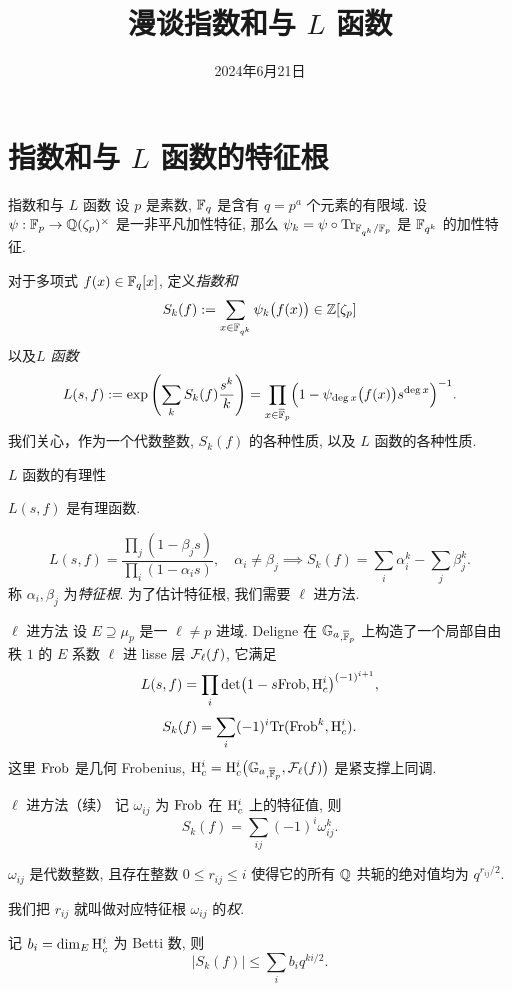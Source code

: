 \documentclass[aspectratio=169,handout]{ctexbeamer}
\title{漫谈指数和与 $L$ 函数}
\date{2024年6月21日}
\begin{document}
\frameoutline

\section{指数和与 $L$ 函数的特征根}

\begin{frame}{指数和与 $L$ 函数}
设 $p$ 是素数, ${\mathbb{F}}_q$ 是含有 $q=p^a$ 个元素的有限域.
设 $\psi:{\mathbb{F}}_p\to {\mathbb{Q}}(\zeta_p)^\times$ 是一非平凡加性特征,
那么 $\psi_k=\psi\circ {\mathrm{Tr}}_{{\mathbb{F}}_{q^k}/{\mathbb{F}}_p}$ 是 ${\mathbb{F}}_{q^k}$ 的加性特征.

对于多项式 $f(x)\in {\mathbb{F}}_q[x]$, 定义\emph{指数和}
\[S_k(f):=\sum_{x\in{\mathbb{F}}_{q^k}}\psi_k\bigl(f(x)\bigr)\in{\mathbb{Z}}[\zeta_p]\]
以及\emph{$L$ 函数}
\[L(s,f):=\exp\left(\sum_k S_k(f)\frac{s^k}{k}\right)=\prod_{x\in\overline{{\mathbb{F}}}_p}\Bigl(1-\psi_{\deg x}\bigl(f(x)\bigr)s^{\deg x}\Bigr)^{-1}.\]
我们关心，作为一个代数整数, $S_k(f)$ 的各种性质, 以及 $L$ 函数的各种性质.
\end{frame}


\begin{frame}{$L$ 函数的有理性}
\begin{theorem}
$L(s,f)$ 是有理函数.
\end{theorem} 
	\[L(s,f)=\frac{\prod_j (1-\beta_j s)}{\prod_i(1-\alpha_i s)},\quad \alpha_i\neq \beta_j
	\implies
	S_k(f)=\sum_i \alpha_i^k-\sum_j\beta_j^k.\]
称 $\alpha_i,\beta_j$ 为\emph{特征根}. 为了估计特征根, 我们需要 $\ell$ 进方法.

\end{frame}


\begin{frame}{$\ell$ 进方法}
设 $E\supseteq \mu_p$ 是一 $\ell\neq p$ 进域.
Deligne 在 ${\mathbb{G}_a}_{,\overline{{\mathbb{F}}}_p}$ 上构造了一个局部自由秩 $1$ 的 $E$ 系数 $\ell$ 进 lisse 层 ${\mathcal{F}}_\ell(f)$, 它满足
	\[L(s,f)=\prod_i \det\bigl(1-s {\mathrm{Frob}},{\mathrm{H}}^i_c\bigr)^{(-1)^{i+1}},\]
	\[S_k(f)=\sum_i (-1)^i{\mathrm{Tr}}({\mathrm{Frob}}^k,{\mathrm{H}}_c^i).\]
这里 ${\mathrm{Frob}}$ 是几何 Frobenius, ${\mathrm{H}}_c^i={\mathrm{H}}_c^i\bigl({\mathbb{G}_a}_{,\overline{{\mathbb{F}}}_p},{\mathcal{F}}_\ell(f)\bigr)$ 是紧支撑上同调.
\end{frame}


\begin{frame}{$\ell$ 进方法（续）}
记 $\omega_{ij}$ 为 ${\mathrm{Frob}}$ 在 ${\mathrm{H}}^i_c$ 上的特征值, 则
	\[S_k(f)=\sum_{ij}(-1)^i \omega_{ij}^k.\]

\begin{theorem}[Deligne]
$\omega_{ij}$ 是代数整数, 且存在整数 $0\le r_{ij}\le i$ 使得它的所有 ${\mathbb{Q}}$ 共轭的绝对值均为 $q^{r_{ij}/2}$.
\end{theorem}
我们把 $r_{ij}$ 就叫做对应特征根 $\omega_{ij}$ 的\emph{权}.

记 $b_i=\dim_{E}{\mathrm{H}}^i_c$ 为 Betti 数, 
则
	\[|S_k(f)|\le \sum_i b_i q^{ki/2}.\]
\end{frame}
\end{document}
